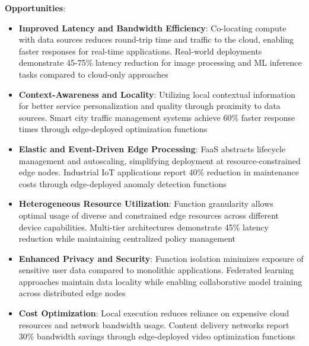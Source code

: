 \textbf{Opportunities}:
\begin{itemize}
    \item \textbf{Improved Latency and Bandwidth Efficiency}: Co-locating compute with data sources reduces round-trip time and traffic to the cloud, enabling faster responses for real-time applications. Real-world deployments demonstrate 45-75\% latency reduction for image processing and ML inference tasks compared to cloud-only approaches
    \item \textbf{Context-Awareness and Locality}: Utilizing local contextual information for better service personalization and quality through proximity to data sources. Smart city traffic management systems achieve 60\% faster response times through edge-deployed optimization functions
    \item \textbf{Elastic and Event-Driven Edge Processing}: FaaS abstracts lifecycle management and autoscaling, simplifying deployment at resource-constrained edge nodes. Industrial IoT applications report 40\% reduction in maintenance costs through edge-deployed anomaly detection functions
    \item \textbf{Heterogeneous Resource Utilization}: Function granularity allows optimal usage of diverse and constrained edge resources across different device capabilities. Multi-tier architectures demonstrate 45\% latency reduction while maintaining centralized policy management
    \item \textbf{Enhanced Privacy and Security}: Function isolation minimizes exposure of sensitive user data compared to monolithic applications. Federated learning approaches maintain data locality while enabling collaborative model training across distributed edge nodes
    \item \textbf{Cost Optimization}: Local execution reduces reliance on expensive cloud resources and network bandwidth usage. Content delivery networks report 30\% bandwidth savings through edge-deployed video optimization functions
\end{itemize}


